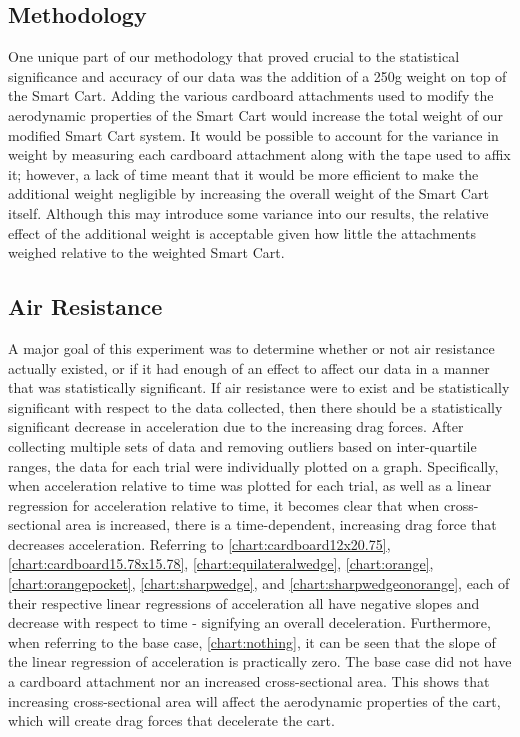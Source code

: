 \subsection{Methodology}
One unique part of our methodology that proved crucial to the statistical
significance and accuracy of our data was the addition of a 250g weight on top of the
Smart Cart. Adding the various cardboard attachments used to modify the aerodynamic properties of the
Smart Cart would increase the total weight of our modified Smart Cart system. It would be possible to
account for the variance in weight by measuring each cardboard attachment along with the tape used to
affix it; however, a lack of time meant that it would be more efficient to make the additional weight
negligible by increasing the overall weight of the Smart Cart itself. Although this may introduce some
variance into our results, the relative effect of the additional weight is acceptable given how little
the attachments weighed relative to the weighted Smart Cart.

\subsection{Air Resistance}
A major goal of this experiment was to determine whether or not air resistance actually existed, or if 
it had enough of an effect to affect our data in a manner that was statistically significant. If air resistance
were to exist and be statistically significant with respect to the data collected, then there should be a statistically significant
decrease in acceleration due to the increasing drag forces. After collecting multiple sets of
data and removing outliers based on inter-quartile ranges, the data for each trial were individually plotted on a graph.
Specifically, when acceleration relative to time was plotted for each trial, as well as a linear regression for acceleration relative to time,
it becomes clear that when cross-sectional area is increased, there is a time-dependent, increasing drag force that decreases acceleration.
Referring to \ref{chart:cardboard12x20.75}, \ref{chart:cardboard15.78x15.78}, \ref{chart:equilateralwedge}, \ref{chart:orange}, \ref{chart:orangepocket}, \ref{chart:sharpwedge}, and \ref{chart:sharpwedgeonorange},
each of their respective linear regressions of acceleration all have negative slopes and decrease with respect to time - signifying an overall deceleration.
Furthermore, when referring to the base case, \ref{chart:nothing}, it can be seen that the slope of the linear regression of acceleration is
practically zero. The base case did not have a cardboard attachment nor an increased cross-sectional area.
This shows that increasing cross-sectional area will affect the aerodynamic properties of the cart,
which will create drag forces that decelerate the cart.

